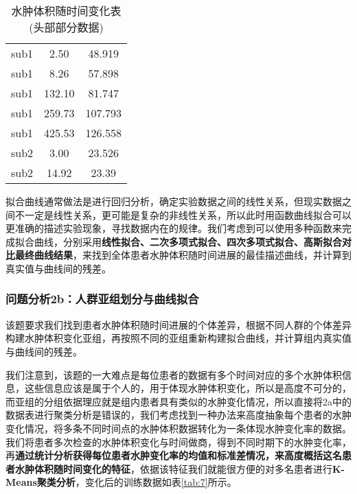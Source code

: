 \documentclass[bwprint]{gmcmthesis}
\begin{document}
				\begin{table}[H]
					\caption{水肿体积随时间变化表(头部部分数据)}
					\label{tab:6}
					\begin{tabular}{ccc}
						\toprule[1.5pt]
						\makebox[0.3\textwidth][c]{ID} &
						\makebox[0.3\textwidth][c]{Time(h)} & \makebox[0.4\textwidth][c]{Volume(mL)} \\
						\midrule[1pt]
						sub1 & 2.50 & 48.919\\
						sub1 & 8.26 & 57.898\\
						sub1 & 132.10 & 81.747\\
						sub1 & 259.73 & 107.793\\
						sub1 & 425.53 & 126.558\\
						sub2 & 3.00 & 23.526\\
						sub2 & 14.92 & 23.39\\
						\bottomrule[1.5pt]
					\end{tabular}			
				\end{table}
				
				拟合曲线通常做法是进行回归分析，确定实验数据之间的线性关系，但现实数据之间不一定是线性关系，更可能是复杂的非线性关系，所以此时用函数曲线拟合可以更准确的描述实验现象，寻找数据内在的规律。我们考虑到可以使用多种函数来完成拟合曲线，分别采用\textbf{线性拟合、二次多项式拟合、四次多项式拟合、高斯拟合对比最终曲线结果}，来找到全体患者水肿体积随时间进展的最佳描述曲线，并计算到真实值与曲线间的残差。
				
			\subsubsection{问题分析2b：人群亚组划分与曲线拟合}
				该题要求我们找到患者水肿体积随时间进展的个体差异，根据不同人群的个体差异构建水肿体积变化亚组，再按照不同的亚组重新构建拟合曲线，并计算组内真实值与曲线间的残差。
				
				我们注意到，该题的一大难点是每位患者的数据有多个时间对应的多个水肿体积信息，这些信息应该是属于个人的，用于体现水肿体积变化，所以是高度不可分的，而亚组的分组依据理应就是组内患者具有类似的水肿变化情况，所以直接将2a中的数据表进行聚类分析是错误的，我们考虑找到一种办法来高度抽象每个患者的水肿变化情况，将多条不同时间点的水肿体积数据转化为一条体现水肿变化率的数据。我们将患者多次检查的水肿体积变化与时间做商，得到不同时期下的水肿变化率，再\textbf{通过统计分析获得每位患者水肿变化率的均值和标准差情况，来高度概括这名患者水肿体积随时间变化的特征}，依据该特征我们就能很方便的对多名患者进行\textbf{K-Means聚类分析}，变化后的训练数据如表\ref{tab:7}所示。
				
\end{document}
